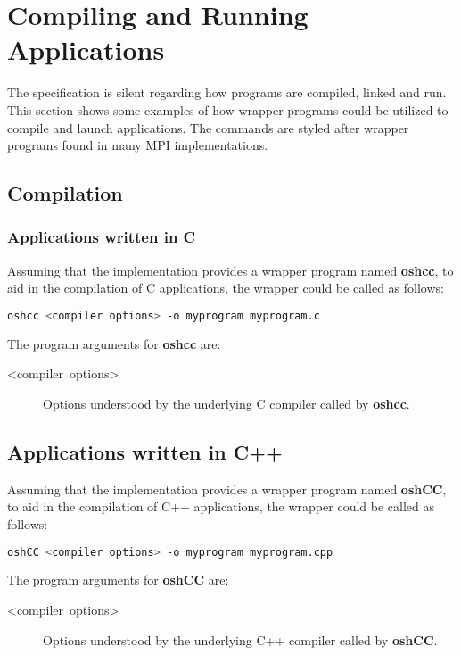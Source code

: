 
\section{Compiling and Running Applications}

The \openshmem specification is silent regarding how \openshmem programs
are compiled, linked and run. This section shows some examples of
how wrapper programs could be utilized to compile and launch applications.
The commands are styled after wrapper programs found in many MPI implementations.


\subsection{Compilation}


\subsubsection{Applications written in C}

Assuming that the implementation provides a wrapper program named
\textbf{oshcc}, to aid in the compilation of C applications, the wrapper
could be called as follows:

\begin{lstlisting}[language=bash]
oshcc <compiler options> -o myprogram myprogram.c
\end{lstlisting}


The program arguments for \textbf{oshcc} are:
\begin{description}
\item [{<compiler\ options>}] Options understood by the underlying C compiler
called by \textbf{oshcc}.
\end{description}

\subsection{Applications written in C++}

Assuming that the implementation provides a wrapper program named
\textbf{oshCC}, to aid in the compilation of C++ applications, the
wrapper could be called as follows:

\begin{lstlisting}[language=bash]
oshCC <compiler options> -o myprogram myprogram.cpp
\end{lstlisting}


The program arguments for \textbf{oshCC} are:
\begin{description}
\item [{<compiler\ options>}] Options understood by the underlying C++
compiler called by \textbf{oshCC}.
\end{description}

